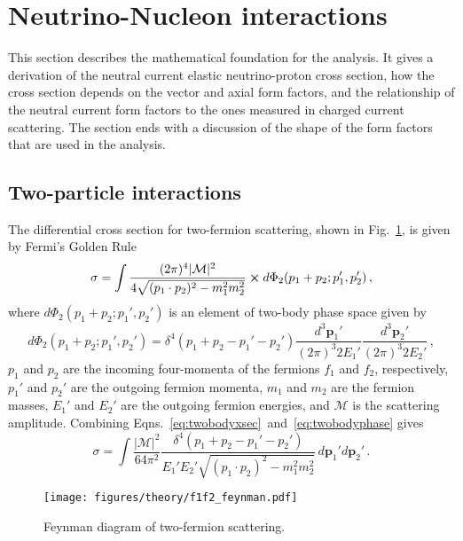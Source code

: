 \section{Neutrino-Nucleon interactions} \label{sec:theory}
\hspace{\parindent}
This section describes the mathematical foundation for the analysis. It gives a
derivation of the neutral current elastic neutrino-proton cross section, how
the cross section depends on the vector and axial form factors, and the
relationship of the neutral current form factors to the ones measured in
charged current scattering. The section ends with a discussion of the shape of
the form factors that are used in the analysis.

\subsection{Two-particle interactions}
  The differential cross section for two-fermion scattering, shown in
  Fig.~\ref{fig:feynmantwofermion}, is given by Fermi's Golden
  Rule~\cite{Aitchison:2004cs}
  \begin{equation}\label{eq:twobodyxsec}
    \sigma = \int \frac{(2\pi)^4 |\mathcal{M}|^2}{4 \sqrt{(p_1\cdot p_2)^2 - m_1^2m_2^2}}
      \cross d\Phi_2(p_1+p_2;p_1',p_2') \,,
  \end{equation}
  where $d\Phi_2(p_1+p_2;p_1',p_2')$ is an element of two-body phase space
  given by
  \begin{equation}\label{eq:twobodyphase}
      d\Phi_2(p_1+p_2;p_1',p_2') = \delta^4(p_1+p_2 - p_1'-p_2')
        \frac{d^3\mathbf{p}_1'}{(2\pi)^3 2E_1'}\frac{d^3\mathbf{p}_2'}{(2\pi)^3 2E_2'} \,,
  \end{equation}
  $p_1$ and $p_2$ are the incoming four-momenta of the fermions $f_1$ and
  $f_2$, respectively, $p_1'$ and $p_2'$ are the outgoing fermion momenta,
  $m_1$ and $m_2$ are the fermion masses, $E_1'$ and $E_2'$ are the outgoing
  fermion energies, and $\mathcal{M}$ is the scattering amplitude.
  Combining Eqns.~\ref{eq:twobodyxsec}~and~\ref{eq:twobodyphase} gives
  \begin{equation}\label{eq:genxsec}
       \sigma = \int \frac{|\mathcal{M}|^2}{64\pi^2}
        \frac{\delta^4(p_1+p_2-p_1'-p_2')}{E_1'E_2'\sqrt{(p_1\cdot p_2)^2 - m_1^2m_2^2}}
        \, d\mathbf{p}_1'd\mathbf{p}_2' \,.
  \end{equation}
  \begin{figure}[ht]
    \centering
    \texttt{[image: figures/theory/f1f2\_feynman.pdf]}
    \caption{Feynman diagram of two-fermion scattering.}
    \label{fig:feynmantwofermion}
  \end{figure}

